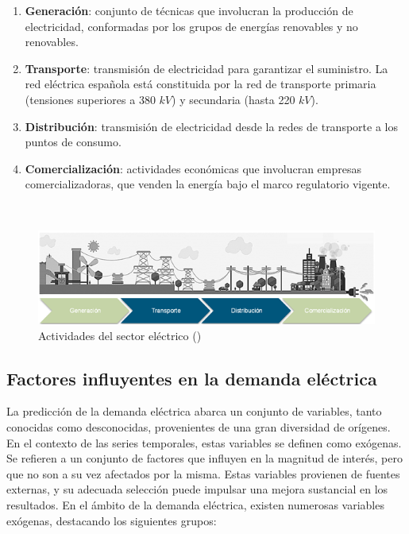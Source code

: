 \documentclass[12pt,a4paper]{report}
\begin{document}
\begin{enumerate}
    \item \textbf{Generación}: conjunto de técnicas que involucran la producción de electricidad, conformadas por los grupos de energías renovables y no renovables.

    \item \textbf{Transporte}: transmisión de electricidad para garantizar el suministro. La red eléctrica española está constituida por la red de transporte primaria (tensiones superiores a 380 $kV$) y secundaria (hasta 220 $kV$).

    \item \textbf{Distribución}: transmisión de electricidad desde la redes de transporte a los puntos de consumo.

    \item \textbf{Comercialización}: actividades económicas que involucran empresas comercializadoras, que venden la energía bajo el marco regulatorio vigente.

\end{enumerate}

\

\begin{figure}[h]
    \centering
    \includegraphics[width=1\textwidth]{Images/tfm-2.1.png}
    \caption{Actividades del sector eléctrico (\cite{yem-energy})}
    \label{fig:sec_elec}
\end{figure}

\subsection{Factores influyentes en la demanda eléctrica}

La predicción de la demanda eléctrica abarca un conjunto de variables, tanto conocidas como desconocidas, provenientes de una gran diversidad de orígenes. En el contexto de las series temporales, estas variables se definen como exógenas. Se refieren a un conjunto de factores que influyen en la magnitud de interés, pero que no son a su vez afectados por la misma. Estas variables provienen de fuentes externas, y su adecuada selección puede impulsar una mejora sustancial en los resultados. En el ámbito de la demanda eléctrica, existen numerosas variables exógenas, destacando los siguientes grupos:
\end{document}
